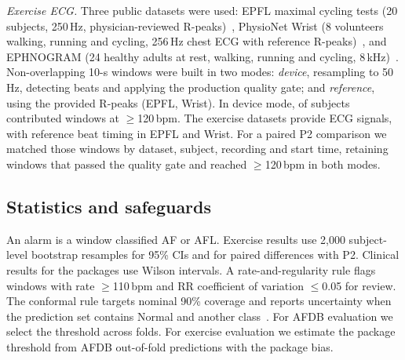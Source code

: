 \documentclass[conference,a4paper]{IEEEtran}
\begin{document}
\textit{Exercise ECG.} Three public datasets were used: EPFL maximal cycling tests (20 subjects, 250\,Hz,
physician-reviewed R-peaks)~\cite{epfl_hi,degiovanni2023}, PhysioNet Wrist (8 volunteers walking, running and cycling, 256\,Hz
chest ECG with reference R-peaks)~\cite{jarchi2016wrist,physionet_wrist}, and EPHNOGRAM (24 healthy adults at rest, walking,
running and cycling, 8\,kHz)~\cite{kazemnejad2021ephnogram,kazemnejad2024}. Non-overlapping 10-s windows were built in two modes: \emph{device}, resampling to
50\,Hz, detecting beats and applying the production quality gate; and \emph{reference}, using the provided R-peaks (EPFL, Wrist).
In device mode, \nSubjEx{} of \nSubjTotal{} subjects contributed \nWinEx{} windows at $\geq$120\,bpm. The exercise datasets
provide ECG signals, with reference beat timing in EPFL and Wrist. For a paired P2 comparison we matched those windows
by dataset, subject, recording and start time, retaining windows that passed the quality gate and reached $\geq$120\,bpm
in both modes.

\subsection{Statistics and safeguards}
An alarm is a window classified AF or AFL. Exercise results use 2{,}000 subject-level bootstrap resamples for 95\% CIs and for
paired differences with P2. Clinical results for the packages use Wilson intervals. A rate-and-regularity rule flags
windows with rate $\geq$110\,bpm and RR coefficient of variation $\leq$0.05 for review. The conformal rule targets nominal
90\% coverage and reports uncertainty when the prediction set contains Normal and another class~\cite{angelopoulos2023}.
For AFDB evaluation we select the threshold across folds. For exercise evaluation we estimate the package threshold
from AFDB out-of-fold predictions with the package bias.
\end{document}
